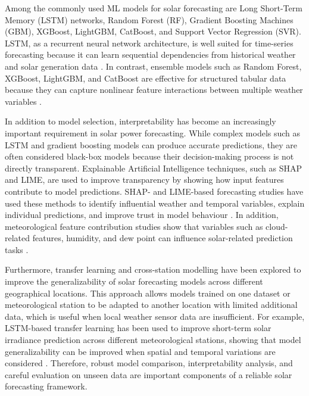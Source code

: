 Among the commonly used ML models for solar forecasting are Long Short-Term Memory (LSTM) networks, Random Forest (RF), Gradient Boosting Machines (GBM), XGBoost, LightGBM, CatBoost, and Support Vector Regression (SVR). LSTM, as a recurrent neural network architecture, is well suited for time-series forecasting because it can learn sequential dependencies from historical weather and solar generation data \parencite{Eren2025, TsaiLo2025, Duvuru2026}. In contrast, ensemble models such as Random Forest, XGBoost, LightGBM, and CatBoost are effective for structured tabular data because they can capture nonlinear feature interactions between multiple weather variables \parencite{JnanaVarshitha2025, Bakht2025, Alhassan2025}.

In addition to model selection, interpretability has become an increasingly important requirement in solar power forecasting. While complex models such as LSTM and gradient boosting models can produce accurate predictions, they are often considered black-box models because their decision-making process is not directly transparent. Explainable Artificial Intelligence techniques, such as SHAP and LIME, are used to improve transparency by showing how input features contribute to model predictions. SHAP- and LIME-based forecasting studies have used these methods to identify influential weather and temporal variables, explain individual predictions, and improve trust in model behaviour \parencite{JnanaVarshitha2025, Eren2025, TsaiLo2025, Duvuru2026}. In addition, meteorological feature contribution studies show that variables such as cloud-related features, humidity, and dew point can influence solar-related prediction tasks \parencite{Pongphaw2025}.

Furthermore, transfer learning and cross-station modelling have been explored to improve the generalizability of solar forecasting models across different geographical locations. This approach allows models trained on one dataset or meteorological station to be adapted to another location with limited additional data, which is useful when local weather sensor data are insufficient. For example, LSTM-based transfer learning has been used to improve short-term solar irradiance prediction across different meteorological stations, showing that model generalizability can be improved when spatial and temporal variations are considered \parencite{Eren2025}. Therefore, robust model comparison, interpretability analysis, and careful evaluation on unseen data are important components of a reliable solar forecasting framework.

